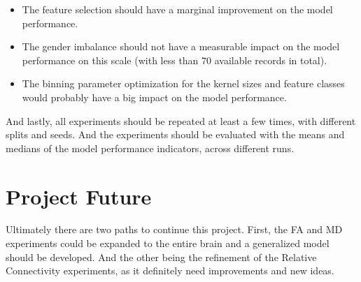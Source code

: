 \begin{itemize}
  \item The feature selection should have a marginal improvement on the model performance.
  \item The gender imbalance should not have a measurable impact on the model performance on this scale (with less than 70 available records in total).
  \item The binning parameter optimization for the kernel sizes and feature classes would probably have a big impact on the model performance.
\end{itemize}
And lastly, all experiments should be repeated at least a few times, with different splits and seeds. And the experiments should be evaluated with the means and medians of the model performance indicators, across different runs.

\section{Project Future}

Ultimately there are two paths to continue this project. First, the \ac{FA} and \ac{MD} experiments could be expanded to the entire brain and a generalized model should be developed. And the other being the refinement of the Relative Connectivity experiments, as it definitely need improvements and new ideas.


